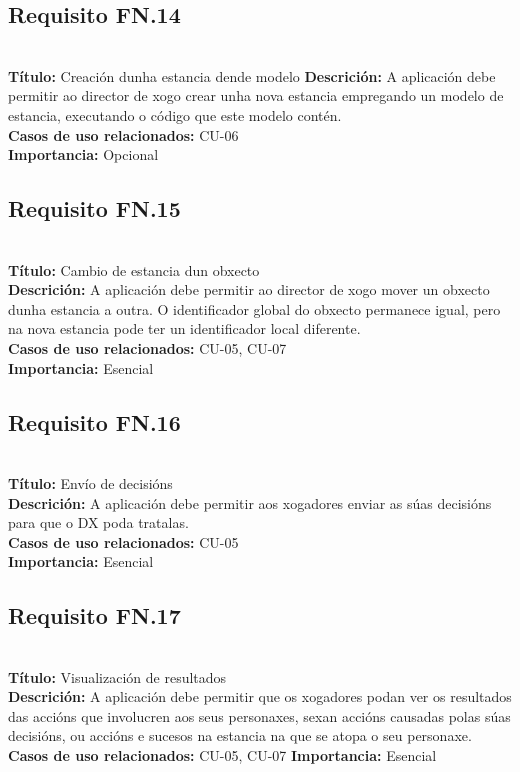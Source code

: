 \subsection{Requisito FN.14}~\\
{\bf Título:} Creación dunha estancia dende modelo
{\bf Descrición:} A aplicación debe permitir ao director de xogo crear unha nova estancia empregando un modelo de estancia, executando o código que este modelo contén.\\
{\bf Casos de uso relacionados:} CU-06\\
{\bf Importancia:} Opcional

\subsection{Requisito FN.15}~\\
{\bf Título:} Cambio de estancia dun obxecto\\
{\bf Descrición:} A aplicación debe permitir ao director de xogo mover un obxecto dunha estancia a outra. O identificador global do obxecto permanece igual, pero na nova estancia pode ter un identificador local diferente.\\
{\bf Casos de uso relacionados:} CU-05, CU-07\\
{\bf Importancia:} Esencial

\subsection{Requisito FN.16}~\\
{\bf Título:} Envío de decisións\\
{\bf Descrición:} A aplicación debe permitir aos xogadores enviar as súas decisións para que o DX poda tratalas.\\
{\bf Casos de uso relacionados:} CU-05\\
{\bf Importancia:} Esencial

\subsection{Requisito FN.17}~\\
{\bf Título:} Visualización de resultados\\
{\bf Descrición:} A aplicación debe permitir que os xogadores podan ver os resultados das accións que involucren aos seus personaxes, sexan accións causadas polas súas decisións, ou accións e sucesos na estancia na que se atopa o seu personaxe.
{\bf Casos de uso relacionados:} CU-05, CU-07
{\bf Importancia:} Esencial



